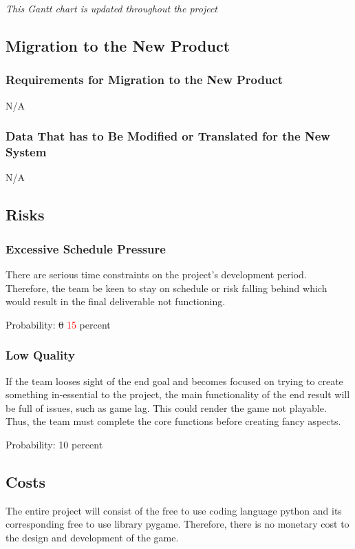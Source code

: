 \documentclass[12pt, titlepage]{article}
\begin{document}
{\it This Gantt chart is updated throughout the project}

\subsection{Migration to the New Product}
\subsubsection{Requirements for Migration to the New Product}
N/A

\subsubsection{Data That has to Be Modified or Translated for the New System}
N/A

\subsection{Risks}
\subsubsection{Excessive Schedule Pressure}
There are serious time constraints on the project's development period. Therefore, the team be keen to stay on schedule or risk falling behind which would result in the final deliverable not functioning.

Probability: \sout{0} \textcolor{red}{15} percent

\subsubsection{Low Quality}
If the team looses sight of the end goal and becomes focused on trying to create something in-essential to the project, the main functionality of the end result will be full of issues, such as game lag. This could render the game not playable. Thus, the team must complete the core functions before creating fancy aspects.

Probability: 10 percent

\subsection{Costs}
The entire project will consist of the free to use coding language python and its corresponding free to use library pygame. Therefore, there is no monetary cost to the design and development of the game.
\end{document}
